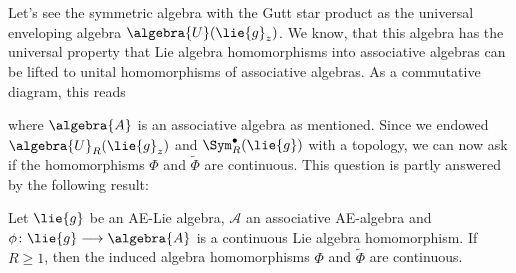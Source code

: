 Let's see the symmetric algebra with  the Gutt star product as the universal 
enveloping algebra $\algebra{U}(\lie{g}_z)$. We know, that this algebra has 
the universal property that Lie algebra homomorphisms into associative 
algebras can be lifted to unital homomorphisms of associative algebras. As a 
commutative diagram, this reads
\begin{center}
\end{center}
where $\algebra{A}$ is an associative algebra as mentioned. Since we endowed 
$\algebra{U}_R(\lie{g}_z)$ and $\Sym_R^{\bullet}(\lie{g})$ with a topology, we 
can now ask if the homomorphisms $\Phi$ and $\widetilde{\Phi}$ are continuous. 
This question is partly answered by the following result:
\begin{proposition}
    \label{LCAna:Prop:Semi-functoriality}%
    Let $\lie{g}$ be an AE-Lie algebra, $\mathcal{A}$ an associative
    AE-algebra and $\phi \colon \lie{g} \longrightarrow \algebra{A}$
    is a continuous Lie algebra homomorphism.  If $R \geq 1$, then the
    induced algebra homomorphisms $\Phi$ and $\widetilde{\Phi}$ are
    continuous.
\end{proposition}
